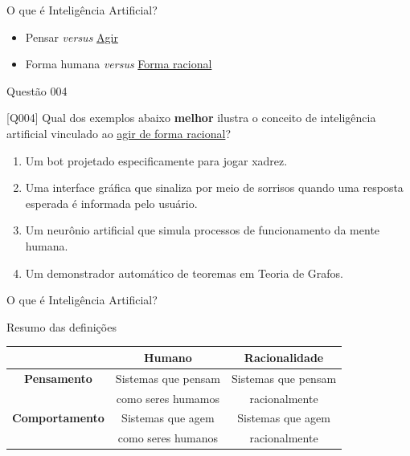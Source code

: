 \documentclass[xcolor=dvipsnames,table]{beamer}
\begin{document}
         \begin{frame}{O que é Inteligência Artificial?}
		\begin{itemize}
			\item Pensar {\it versus} \underline{Agir}
			 \item Forma humana {\it versus} \underline{Forma racional} %
		\end{itemize}
	\end{frame} 

         \begin{frame}{Questão 004}
		\begin{block}{[Q004]}
			Qual dos exemplos abaixo {\bf melhor} ilustra o conceito de inteligência artificial vinculado ao \underline{agir de forma racional}?
		\end{block}
		\begin{enumerate}[label=(\Alph*)]
			\item Um bot projetado especificamente para jogar xadrez.
			\item Uma interface gráfica que sinaliza por meio de sorrisos quando uma resposta esperada é informada pelo usuário.
			\item Um neurônio artificial que simula processos de funcionamento da mente humana.
			\item Um demonstrador automático de teoremas em Teoria de Grafos.
		\end{enumerate}
	\end{frame}
	
	\begin{frame}{O que é Inteligência Artificial?}
		\begin{block}{Resumo das definições}
			\begin{tabular}{c|cc}
								& {\bf Humano} 			& {\bf Racionalidade} \\
				\hline
				{\bf Pensamento}		& Sistemas que pensam	& Sistemas que pensam \\
										& como seres humamos	& racionalmente \\
				\hline
				{\bf Comportamento}		& Sistemas que agem 	& Sistemas que agem\\
										& como seres humanos	& racionalmente\\
				\hline
			\end{tabular}
		\end{block}				
	\end{frame}
	
\end{document}
